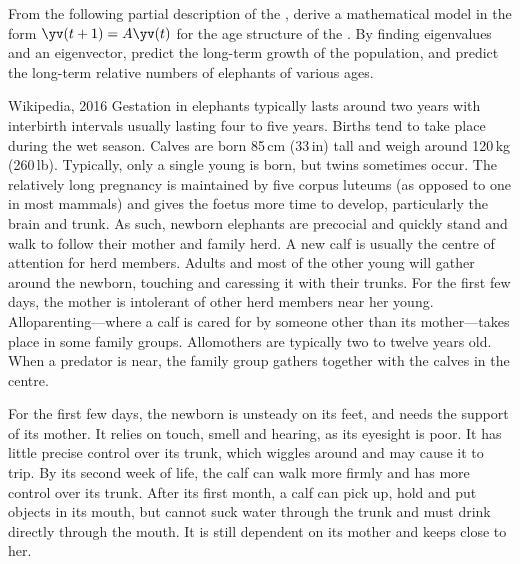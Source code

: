 \begin{exercise} \label{ex:} 
From the following partial description of the , 
derive a mathematical model in the form \(\yv(t+1)=A\yv(t)\) for the age structure of the .
By finding eigenvalues and an eigenvector, predict the long-term growth of the population, and predict the long-term relative numbers of elephants of various ages.
\begin{quoted}{Wikipedia, 2016}
Gestation in elephants typically lasts around two years with interbirth intervals usually lasting four to five years. Births tend to take place during the wet season. Calves are born 85\,cm (33\,in) tall and weigh around 120\,kg (260\,lb). Typically, only a single young is born, but twins sometimes occur.  The relatively long pregnancy is maintained by five corpus luteums (as opposed to one in most mammals) and gives the foetus more time to develop, particularly the brain and trunk. As such, newborn elephants are precocial and quickly stand and walk to follow their mother and family herd.  A new calf is usually the centre of attention for herd members.  Adults and most of the other young will gather around the newborn, touching and caressing it with their trunks.  For the first few days, the mother is intolerant of other herd members near her young.  Alloparenting---where a calf is cared for by someone other than its mother---takes place in some family groups.  Allomothers are typically two to twelve years old. When a predator is near, the family group gathers together with the calves in the centre.

For the first few days, the newborn is unsteady on its feet, and needs the support of its mother. It relies on touch, smell and hearing, as its eyesight is poor. It has little precise control over its trunk, which wiggles around and may cause it to trip. By its second week of life, the calf can walk more firmly and has more control over its trunk. After its first month, a calf can pick up, hold and put objects in its mouth, but cannot suck water through the trunk and must drink directly through the mouth. It is still dependent on its mother and keeps close to her.


\end{quoted}
\end{exercise}
